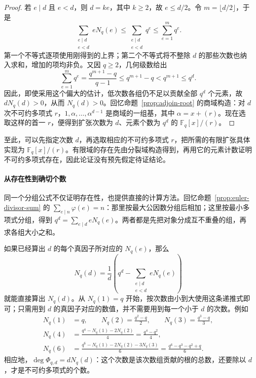 \documentclass[lang=cn,a4paper,fontset=none,zihao=false,10pt,openany,twoside]{beautybook}
\numberwithin{algorithm}{chapter}
\begin{document}
\begin{proof}
若 $e\mid d$ 且 $e<d$，则 $d=ke$，其中 $k\ge2$，故 $e\le d/2$。令 $m=\lfloor d/2\rfloor$，于是
\[
 \sum_{\substack{e\mid d\\e<d}}eN_q(e)
 \le\sum_{\substack{e\mid d\\e<d}}q^e
 \le\sum_{e=1}^{m}q^e.
\]
第一个不等式逐项使用刚得到的上界；第二个不等式将不整除 $d$ 的那些次数也纳入求和，增加的项均非负。又因 $q\ge2$，几何级数给出
\[
 \sum_{e=1}^{m}q^e
 =\frac{q^{m+1}-q}{q-1}
 \le q^{m+1}-q<q^{m+1}\le q^d.
\]
因此，即使采用这个偏大的估计，低次数各组仍不足以贡献全部 $q^d$ 个元素，故 $dN_q(d)>0$，从而 $N_q(d)>0$。回忆命题~\ref{prop:adjoin-root} 的商域构造：对 $d$ 次不可约多项式 $r$，$1,\alpha,\ldots,\alpha^{d-1}$ 是商域的一组基，其中 $\alpha=x+(r)$。现在选取这样的首一 $r$，便得到扩张次数为 $d$、元素个数为 $q^d$ 的 $\mathbb F_q[x]/(r)$。
\end{proof}
至此，可以先指定次数 $d$，再选取相应的不可约多项式 $r$，把所需的有限扩张具体实现为 $\mathbb F_q[x]/(r)$。有限域的存在先由分裂域构造得到，再用它的元素计数证明不可约多项式存在，因此论证没有预先假定待证结论。

\paragraph{从存在性到确切个数}
同一个分组公式不仅证明存在性，也提供直接的计算方法。回忆命题~\ref{prop:euler-divisor-sum} 的 $\sum_{e\mid n}\varphi(e)=n$：那里按最大公因数分组后相加；这里按最小多项式分组，得到 $q^d=\sum_{e\mid d}eN_q(e)$。两者都是先把对象分成互不重叠的组，再求各组大小之和。

如果已经算出 $d$ 的每个真因子所对应的 $N_q(e)$，那么
\[
 N_q(d)=\frac1d\left(q^d-
 \sum_{\substack{e\mid d\\e<d}}eN_q(e)\right)
\]
就能直接算出 $N_q(d)$。从 $N_q(1)=q$ 开始，按次数由小到大使用这条递推式即可；只需用到 $d$ 的真因子对应的数值，并不需要用到每一个小于 $d$ 的次数。例如
\[
 \begin{aligned}
 N_q(1)&=q,\qquad
 N_q(2)=\frac{q^2-q}{2},\qquad
 N_q(3)=\frac{q^3-q}{3},\\
 N_q(4)&=\frac{q^4-N_q(1)-2N_q(2)}4
       =\frac{q^4-q^2}{4},\\
 N_q(6)&=\frac{q^6-N_q(1)-2N_q(2)-3N_q(3)}6
       =\frac{q^6-q^3-q^2+q}{6}.
 \end{aligned}
\]
相应地，$\deg\Phi_{q,d}=dN_q(d)$：这个次数是该次数组贡献的根的总数，还要除以 $d$，才是不可约多项式的个数。
\end{document}
